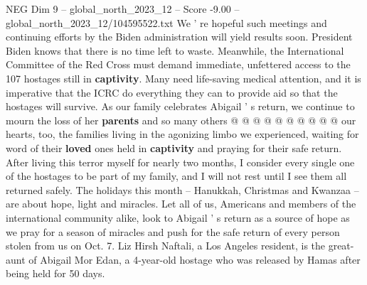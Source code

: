 \begin{textsample}{NEG Dim 9 – global\_north\_2023\_12 – Score -9.00 – global\_north\_2023\_12/104595522.txt}
We ' re hopeful such meetings and continuing efforts by the Biden administration will yield results soon.
President Biden knows that there is no time left to waste.
Meanwhile, the International Committee of the Red Cross must demand immediate, unfettered access to the 107 hostages still in \textbf{captivity}.
Many need life-saving medical attention, and it is imperative that the ICRC do everything they can to provide aid so that the hostages will survive.
As our family celebrates Abigail ' s return, we continue to mourn the loss of her \textbf{parents} and so many others @ @ @ @ @ @ @ @ @ @ our hearts, too, the families living in the agonizing limbo we experienced, waiting for word of their \textbf{loved} ones held in \textbf{captivity} and praying for their safe return.
After living this terror myself for nearly two months, I consider every single one of the hostages to be part of my family, and I will not rest until I see them all returned safely.
The holidays this month -- Hanukkah, Christmas and Kwanzaa -- are about hope, light and miracles.
Let all of us, Americans and members of the international community alike, look to Abigail ' s return as a source of hope as we pray for a season of miracles and push for the safe return of every person stolen from us on Oct. 7.
Liz Hirsh Naftali, a Los Angeles resident, is the great-aunt of Abigail Mor Edan, a 4-year-old hostage who was released by Hamas after being held for 50 days.

\end{textsample}
